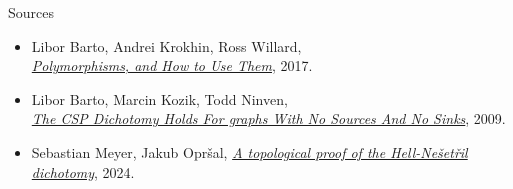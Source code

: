 \documentclass[aspectratio=169]{beamer}
\begin{document}
\begin{frame}{Sources}

\begin{itemize}
    \item Libor Barto, Andrei Krokhin, Ross Willard,\\
    \href{https://drops.dagstuhl.de/storage/02dagstuhl-follow-ups/dfu-vol007/DFU.Vol7.15301.1/DFU.Vol7.15301.1.pdf}{\textit{Polymorphisms, and How to Use Them}}, 2017.
    \item Libor Barto, Marcin Kozik, Todd Ninven,\\
    \href{https://www.karlin.mff.cuni.cz/~barto/Articles/CSPSmooth.pdf}{\textit{The CSP Dichotomy Holds For graphs With No Sources And No Sinks}}, 2009.
    \item Sebastian Meyer, Jakub Opr\v sal, \href{https://arxiv.org/abs/2409.12627}{\textit{A topological proof of the Hell-Ne\v set\v ril dichotomy}}, 2024.
\end{itemize}

\end{frame}

\end{document}
